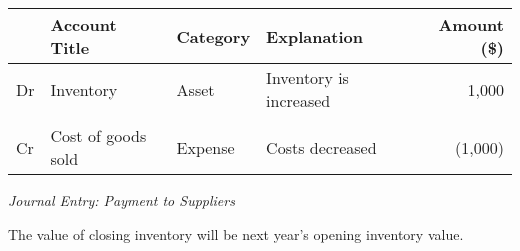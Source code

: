 \begin{center} 
\begin{tabular}{@{} l l l l r @{}}
\toprule
& \textbf{Account Title} & \textbf{Category} & \textbf{Explanation} & \textbf{Amount (\$)} \\
\midrule
Dr & Inventory & Asset & Inventory is increased & 1,000 \\
 & \quad  & \\
Cr & Cost of goods sold & Expense & Costs decreased & (1,000) \\
\bottomrule
\end{tabular}
\end{center}
\vspace{1em}
\textit{Journal Entry: Payment to Suppliers}

The value of closing inventory will be next year's opening inventory value.




